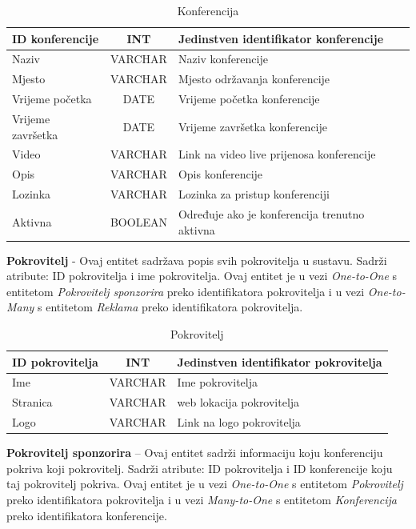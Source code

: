 \begin{table}[H]
	\caption{Konferencija}
	\label{tbl:konferencija}
	\centering
	\begin{tabular}{|l|c|l|} 
		\hline
		\cellcolor{lightgreen}ID konferencije & INT & Jedinstven identifikator konferencije\\ 
		\hline
		Naziv & VARCHAR & Naziv konferencije\\ 
		\hline
		Mjesto & VARCHAR & Mjesto održavanja konferencije\\ 
		\hline
		Vrijeme početka & DATE & Vrijeme početka konferencije\\ 
		\hline
		Vrijeme završetka & DATE & Vrijeme završetka konferencije\\ 
		\hline
		Video & VARCHAR & Link na video live prijenosa konferencije\\ 
		\hline
		Opis & VARCHAR & Opis konferencije\\ 
		\hline
		Lozinka & VARCHAR & Lozinka za pristup konferenciji\\ 
		\hline
		Aktivna & BOOLEAN & Određuje ako je konferencija trenutno aktivna\\ 
		\hline
	\end{tabular}
\end{table}

\textbf{Pokrovitelj} - Ovaj entitet sadržava popis svih pokrovitelja u sustavu. Sadrži atribute: ID pokrovitelja i ime pokrovitelja. Ovaj entitet je u vezi \textit{One-to-One} s entitetom \textit{Pokrovitelj sponzorira} preko identifikatora pokrovitelja i u vezi \textit{One-to-Many} s entitetom \textit{Reklama} preko identifikatora pokrovitelja.

\begin{table}[H]
	\caption{Pokrovitelj}
	\label{tbl:pokrovitelj}
	\centering
	\begin{tabular}{|l|c|l|} 
		\hline
		\cellcolor{lightgreen}ID pokrovitelja & INT & Jedinstven identifikator pokrovitelja\\ 
		\hline
		Ime & VARCHAR & Ime pokrovitelja\\ 
		\hline
		Stranica & VARCHAR & web lokacija pokrovitelja\\ 
		\hline
		Logo & VARCHAR & Link na logo pokrovitelja\\ 
		\hline
	\end{tabular}
\end{table}

\textbf{Pokrovitelj sponzorira} – Ovaj entitet sadrži informaciju koju konferenciju pokriva koji pokrovitelj. Sadrži atribute: ID pokrovitelja i ID konferencije koju taj pokrovitelj pokriva. Ovaj entitet je u vezi \textit{One-to-One} s entitetom \textit{Pokrovitelj} preko identifikatora pokrovitelja i u vezi \textit{Many-to-One} s entitetom \textit{Konferencija} preko identifikatora konferencije.

